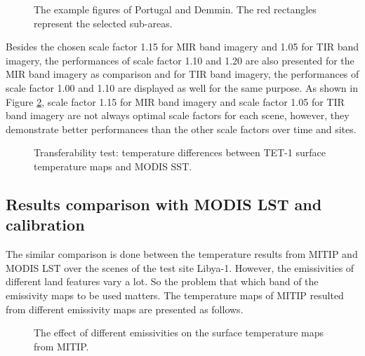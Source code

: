 \begin{figure}[!htbp]
\centering
{}
\vspace{0.5in}
\caption{The example figures of Portugal and Demmin. The red rectangles represent the selected sub-areas.}
\label{fig:portugal&demmin}
\end{figure}

\noindent Besides the chosen scale factor 1.15 for MIR band imagery and 1.05 for TIR band imagery, the performances of scale factor 1.10 and 1.20 are also presented for the MIR band imagery as comparison and for TIR band imagery, the performances of scale factor 1.00 and 1.10 are displayed as well for the same purpose. As shown in Figure \ref{fig:SST_test}, scale factor 1.15 for MIR band imagery and scale factor 1.05 for TIR band imagery are not always optimal scale factors for each scene, however, they demonstrate better performances than the other scale factors over time and sites.\\

\begin{figure}[!htbp]
\centering
{}
\hspace{0.5in}
\caption{Transferability test: temperature differences between TET-1 surface temperature maps and MODIS SST.}
\label{fig:SST_test}
\end{figure}


\subsection{Results comparison with MODIS LST and calibration}
The similar comparison is done between the temperature results from MITIP and MODIS LST over the scenes of the test site Libya-1. However, the emissivities of different land features vary a lot. So the problem that which band of the emissivity maps to be used matters. The temperature maps of MITIP resulted from different emissivity maps are presented as follows.\\

\begin{figure}[!htbp]
\centering
{}
\hspace{0.5in}
\caption{The effect of different emissivities on the surface temperature maps from MITIP.}
\label{fig:diff_emi_Lybia}
\end{figure}


